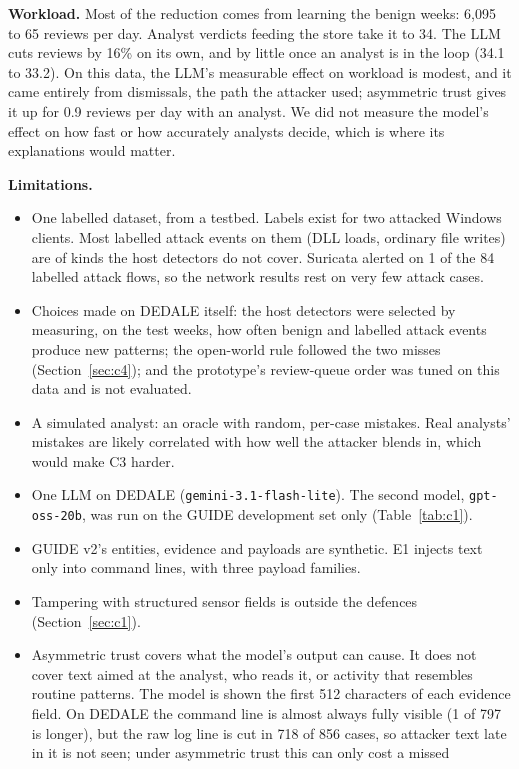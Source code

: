 \documentclass[conference]{IEEEtran}
\begin{document}
\textbf{Workload.} Most of the reduction comes from learning the benign weeks: 6,095 to 65 reviews per day. Analyst verdicts feeding
the store take it to 34. The LLM cuts reviews by 16\% on its own, and by little once an analyst is in the loop
(34.1 to 33.2). On this data, the LLM's measurable effect on workload is modest, and it came entirely from
dismissals, the path the attacker used; asymmetric trust gives it up for 0.9 reviews per day with an analyst. We
did not measure the model's effect on how fast or how accurately analysts decide, which is where its explanations
would matter.

\textbf{Limitations.}
\begin{itemize}
\item One labelled dataset, from a testbed. Labels exist for two attacked Windows clients. Most labelled attack
events on them (DLL loads, ordinary file writes) are of kinds the host detectors do not cover. Suricata alerted on
1 of the 84 labelled attack flows, so the network results rest on very few attack cases.
\item Choices made on DEDALE itself: the host detectors were selected by measuring, on the test weeks, how often
benign and labelled attack events produce new patterns; the open-world rule followed the two misses
(Section~\ref{sec:c4}); and the prototype's review-queue order was tuned on this data and is not evaluated.
\item A simulated analyst: an oracle with random, per-case mistakes. Real analysts' mistakes are likely correlated
with how well the attacker blends in, which would make C3 harder.
\item One LLM on DEDALE (\texttt{gemini-3.1-flash-lite}). The second model, \texttt{gpt-oss-20b}, was run on the GUIDE
development set only (Table~\ref{tab:c1}).
\item GUIDE v2's entities, evidence and payloads are synthetic. E1 injects text only into command lines, with three
payload families.
\item Tampering with structured sensor fields is outside the defences (Section~\ref{sec:c1}).
\item Asymmetric trust covers what the model's output can cause. It does not cover text aimed at the analyst, who
reads it, or activity that resembles routine patterns. The model is shown the first 512 characters of each evidence
field. On DEDALE the command line is almost always fully visible (1 of 797 is longer), but the raw log line is cut
in 718 of 856 cases, so attacker text late in it is not seen; under asymmetric trust this can only cost a missed

\end{itemize}
\end{document}

